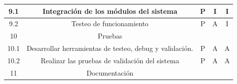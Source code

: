 \documentclass[11pt]{charter}
\begin{document}
\begin{table}[]
\begin{tabular}{|c|c|c|c|c|}
9.1                                                                                            & Integración de los módulos del sistema                                             & P                                                                           & I                                                                  & I                                                                    \\ \hline
9.2                                                                                            & Testeo de funcionamiento                                                           & P                                                                           & A                                                                  & I                                                                    \\ \hline
\rowcolor[HTML]{CBCEFB} 
10                                                                                             & Pruebas                                                                            &                                                                             &                                                                    &                                                                      \\ \hline
10.1                                                                                           & Desarrollar herramientas de testeo, debug y validación.                            & P                                                                           & A                                                                  & A                                                                    \\ \hline
10.2                                                                                           & Realizar las pruebas de validación del sistema                                     & P                                                                           & A                                                                  & A                                                                    \\ \hline
\rowcolor[HTML]{CBCEFB} 
11                                                                                             & Documentación                                                                      &                                                                             &                                                                    &                                                                      \\ \hline

\end{tabular}
\end{table}
\end{document}
